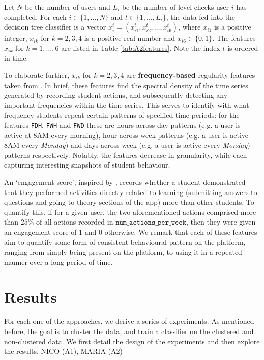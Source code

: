 \documentclass[sigplan,screen]{acmart}
\begin{document}
Let $N$ be the number of users and $L_i$ be the number of level checks user $i$ has completed. For each $i \in \{1,\ldots,N\}$ and $t \in \{1, \ldots, L_i\}$, the data fed into the decision tree classifier is a vector $x_i^t = (x_{i1}^t, x_{i2}^t, \ldots, x_{i6}^t)$, where $x_{i1}$ is a positive integer, $x_{ik}$ for $k=2,3,4$ is a positive real number and $x_{i6} \in \{0,1\}$. The features $x_{ik}$ for $k=1,\ldots, 6$ are listed in Table 
\ref{tab:A2features}. Note the index $t$ is ordered in time. 

To elaborate further, $x_{ik}$ for $k=2,3,4$ are \textbf{frequency-based} regularity features taken from \cite{quantifyreg}. In brief, these features find the spectral density of the time series generated by recording student actions, and subsequently detecting any important frequencies within the time series. This serves to identify with what frequency students repeat certain patterns of specified time periods: for the features \texttt{FDH}, \texttt{FWH} and \texttt{FWD} these are hours-across-day patterns (e.g. a user is active at 8AM every morning), hour-across-week patterns (e.g. a user is active 8AM every \textit{Monday}) and days-across-week (e.g. a user is active every \textit{Monday}) patterns respectively. Notably, the features decrease in granularity, while each capturing interesting snapshots of student behaviour. 

An `engagement score', inspired by \cite{student_engagement}, records whether a student demonstrated that they performed activities directly related to learning (submitting answers to questions and going to theory sections of the app) more than other students. To quantify this, if for a given user, the two aforementioned actions comprised more than $25\%$ of all actions recorded in $\texttt{num\_actions\_per\_week}$, then they were given an engagement score of $1$ and $0$ otherwise. We remark that each of these features aim to quantify some form of consistent behavioural pattern on the platform, ranging from simply being present on the platform, to using it in a repeated manner over a long period of time. 

\section{Results}\label{sec:results}

For each one of the approaches, we derive a series of experiments. As mentioned before, the goal is to cluster the data, and train a classifier on the clustered and non-clustered data. We first detail the design of the experiments and then explore the results.
{\color{red}NICO (A1), MARIA (A2)}
\end{document}
